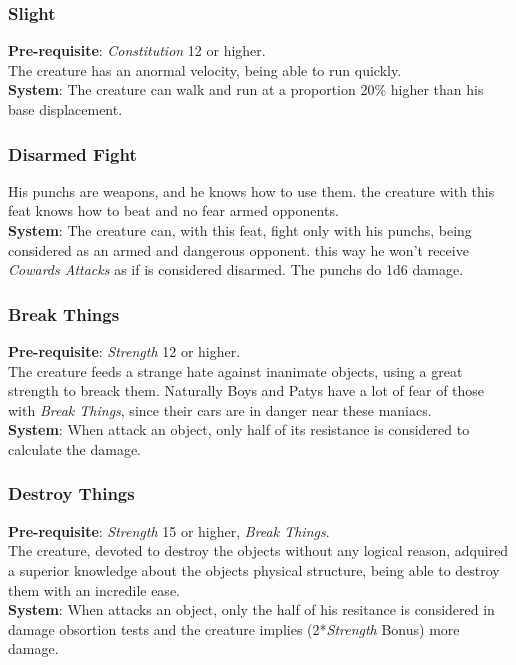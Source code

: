 \documentclass[ letterpaper,12pt]{article}
\begin{document}
\subsubsection{Slight}
{\bf Pre-requisite}: {\it Constitution} 12 or higher.\\
The creature has an anormal velocity, being able to run quickly.\\
{\bf System}: The creature can walk and run at a proportion 20\% higher than his base displacement.

\subsubsection{Disarmed Fight}
His punchs are weapons, and he knows how to use them. the creature with this feat knows how to beat and no fear armed opponents.\\
{\bf System}: The creature can, with this feat, fight only with his punchs, being considered as an armed and dangerous opponent. this way he won't receive {\it Cowards Attacks} as if is considered disarmed. The punchs do 1d6 damage.

\subsubsection{Break Things}
{\bf Pre-requisite}: {\it Strength} 12 or higher.\\
The creature feeds a strange hate against inanimate objects, using a great strength to breack them. Naturally Boys and Patys have a lot of fear of those with {\it Break Things}, since their cars are in danger near these maniacs.\\
{\bf System}: When attack an object, only half of its resistance is considered to calculate the damage.

\subsubsection{Destroy Things}
{\bf Pre-requisite}: {\it Strength} 15 or higher, {\it Break Things}.\\
The creature, devoted to destroy the objects without any logical reason, adquired a superior knowledge about the objects physical structure, being able to destroy them with an incredile ease.\\
{\bf System}: When attacks an object, only the half of his resitance is considered in damage obsortion tests and the creature implies (2*{\it Strength} Bonus) more damage.\\
\end{document}
